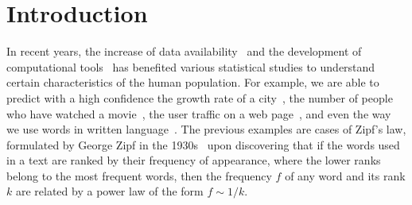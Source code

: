 \documentclass[10pt,letterpaper]{article} %
\begin{document}


\section*{Introduction} %



In recent years, the increase of data availability~\cite{Hilbert60} and the development of computational tools~\cite{doi:10.1098/rsta.2019.0061} has
benefited various statistical studies to understand certain characteristics of
the human population. For example, we are able to predict with a high confidence the growth rate of a
city~\cite{Batty:2012Cities,Murcio2015}, the number of people who have watched a movie~\cite{sinha2005blockbusters}, the user traffic on a web
page~\cite{BARABASI200069}, and even the way we use words in written language~\cite{Montemurro2001567,ZipfRnd2002}. The previous examples
are cases of  Zipf's law, formulated by George Zipf in the 1930s~\cite{Zipf,Petruszewycz1973Lhistoire-de-la,newman2005power,1367-2630-13-4-043004,Perc07122012,1367-2630-15-9-093033} upon
discovering that if  the words used in a text are ranked by their frequency of
appearance, where the lower ranks belong to the most frequent words,  then the
frequency  $f$  of any word and its rank  $k$ are related by a power law of the
form $f\sim1/k$.
\end{document}
